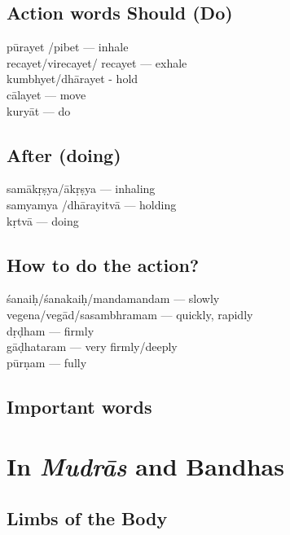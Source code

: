 \subsection*{Action words Should (Do)}

\begin{multicols}{2}
pūrayet /pibet --- inhale\\
recayet/virecayet/ recayet --- exhale \\
kumbhyet/dhārayet - hold\\
cālayet --- move\\
kuryāt --- do
\end{multicols}

\subsection*{After (doing)}

\begin{multicols}{2}
samākṛṣya/ākṛṣya --- inhaling \\
samyamya /dhārayitvā  --- holding\\
kṛtvā --- doing
\end{multicols}

\subsection*{How to do the action?}

\begin{multicols}{2}
śanaiḥ/śanakaiḥ/mandamandam --- slowly\\
vegena/vegād/sasambhramam --- quickly, rapidly\\
dṛḍham --- firmly\\
gāḍhataram --- very firmly/deeply\\
pūrṇam --- fully
\end{multicols}

\subsection*{Important words}

\section*{In \textit{Mudrās} and Bandhas}

\subsection*{Limbs of the Body}


